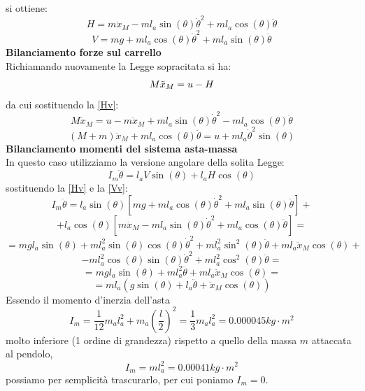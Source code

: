 si ottiene:
\begin{equation}\label{Hv}
H=m\ddot{x}_M-ml_a\sin(\theta)\dot{\theta}^2+ml_a\cos(\theta)\ddot{\theta}
\end{equation}
\begin{equation}\label{Vv}
V=mg+ml_a\cos(\theta)\dot{\theta}^2+ml_a\sin(\theta)\ddot{\theta}
\end{equation}
\textbf{Bilanciamento forze sul carrello}\\
Richiamando nuovamente la Legge sopracitata si ha:
\begin{equation}\notag
M\ddot{x}_M=u-H
\end{equation}
da cui sostituendo la \ref{Hv}:
$$
M\ddot{x}_M=u-m\ddot{x}_M+ml_a\sin(\theta)\dot{\theta}^2-ml_a\cos(\theta)\ddot{\theta}
$$
\begin{equation}\label{FCarr}
(M+m)\ddot{x}_M+ml_a\cos(\theta)\ddot{\theta}=u+ml_a\dot{\theta}^2\sin(\theta)
\end{equation} 
\textbf{Bilanciamento momenti del sistema asta-massa}\\
In questo caso utilizziamo la versione angolare della solita Legge:
\begin{equation}
I_m\ddot{\theta}=l_aV\sin(\theta)+l_aH\cos(\theta)
\end{equation}
sostituendo la \ref{Hv} e la \ref{Vv}:
$$
I_m\ddot{\theta}=l_a\sin(\theta)[mg+ml_a\cos(\theta)\dot{\theta}^2+ml_a\sin(\theta)\ddot{\theta}]+$$$$+l_a\cos(\theta)[m\ddot{x}_M-ml_a\sin(\theta)\dot{\theta}^2+ml_a\cos(\theta)\ddot{\theta}]=
$$
$$
=mgl_a\sin(\theta)+ml_a^2\sin(\theta)\cos(\theta)\dot{\theta}^2+ml_a^2\sin^2(\theta)\ddot{\theta}+ml_a\ddot{x}_M\cos(\theta)+$$$$-ml_a^2\cos(\theta)\sin(\theta)\dot{\theta}^2
+ml_a^2\cos^2(\theta)\ddot{\theta}=$$
$$=mgl_a\sin(\theta)+ml_a^2\ddot{\theta}+ml_a\ddot{x}_M\cos(\theta) =
$$
\begin{equation} \label{momInThetaP}
=ml_a(g\sin(\theta)+l_a\ddot{\theta}+\ddot{x}_M\cos(\theta))
\end{equation}
Essendo il momento d'inerzia dell'asta $$
I_m=\displaystyle\frac{1}{12}m_al_a^2+m_a(\displaystyle\frac{l}{2})^2=\displaystyle\frac{1}{3}m_al_a^2=0.000045kg\cdot m^2$$molto inferiore (1 ordine di grandezza) rispetto a quello della massa $m$ attaccata al pendolo, $$
I_m=ml_a^2=0.00041kg\cdot m^2$$ possiamo per semplicità trascurarlo, per cui poniamo $I_m=0$.

